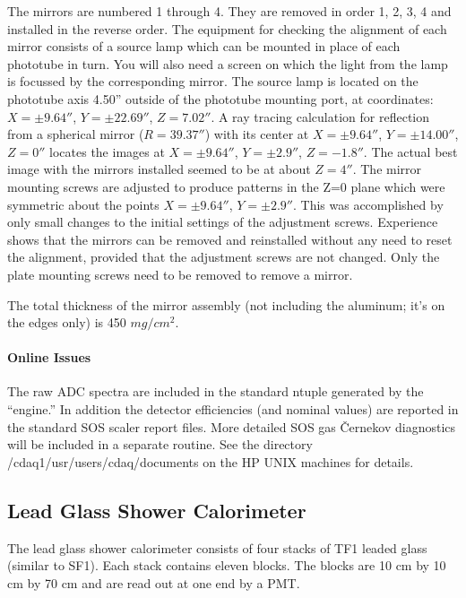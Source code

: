 	The mirrors are numbered 1 through 4.  They are removed in
order 1, 2, 3, 4 and installed in the reverse order.  The equipment
for checking the alignment of each mirror consists of a source lamp
which can be mounted in place of each phototube in turn.  You will
also need a screen on which the light from the lamp is focussed by the
corresponding mirror.  The source lamp is located on the phototube
axis 4.50'' outside of the phototube mounting port, at coordinates:
$X = \pm9.64''$, $Y = \pm22.69''$, $Z = 7.02''$.  A ray tracing
calculation for reflection from a spherical mirror ($R = 39.37''$)
with its center at $X = \pm9.64''$, $Y = \pm14.00''$, $Z = 0''$
locates the images at $X = \pm9.64''$, $Y = \pm2.9''$, $Z = -1.8''$.
The actual best image with the mirrors installed seemed to be at about
$Z = 4''$.  The mirror mounting screws are adjusted to produce
patterns in the Z=0 plane which were symmetric about the points $X =
\pm9.64''$, $Y = \pm2.9''$.  This was accomplished by only small
changes to the initial settings of the adjustment screws.  Experience
shows that the mirrors can be removed and reinstalled without any need
to reset the alignment, provided that the adjustment screws are not
changed.  Only the plate mounting screws need to be removed to remove
a mirror.

	The total thickness of the mirror assembly (not including the
aluminum; it's on the edges only) is 450 $mg/cm^{2}$.

\paragraph{Online Issues}

	The raw ADC spectra are included in the standard ntuple
generated by the ``engine.''  In addition the detector efficiencies
(and nominal values) are reported in the standard SOS scaler report
files.  More detailed SOS gas \v{C}ernekov diagnostics will be
included in a separate routine.  See the directory
/cdaq1/usr/users/cdaq/documents on the HP UNIX machines for details.


\subsection{Lead Glass Shower Calorimeter }

The lead glass shower calorimeter consists of four stacks of
TF1 leaded glass (similar to SF1). Each stack contains eleven
blocks. The blocks are 10 cm by 10 cm by 70 cm and are read
out at one end by a PMT.

